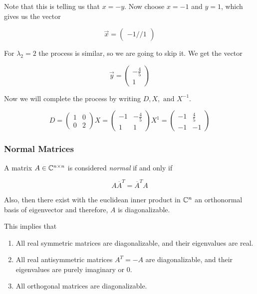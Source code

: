 Note that this is telling us that \(x = -y\). Now choose \(x = -1\) and \(y = 1\), which gives us 
the vector 

\[
    \vec{x} = \begin{pmatrix}
        -1 // 1
    \end{pmatrix}
\]

For \(\lambda_2 = 2\) the process is similar, so we are going to skip it. We get the vector

\[
    \vec{y} = \begin{pmatrix}
        -\frac{4}{5} \\ 1
    \end{pmatrix}
\]

Now we will complete the process by writing \(D, X, \text{ and } X^{-1}\).

\[
    D = \begin{pmatrix}
        1 & 0 \\
        0 & 2
    \end{pmatrix}
    X = \begin{pmatrix}
        -1  & -\frac{4}{5} \\
        1   &   1 
    \end{pmatrix}
    X^{1} = \begin{pmatrix}
        -1  & \frac{4}{5} \\
        -1   &   -1 
    \end{pmatrix}
\]

\subsubsection{Normal Matrices}

A matrix \(A \in \mathbb{C}^{n \times n}\) is considered \emph{normal} if and only if 

\[
    A \overline{A}^{T} = \overline{A}^T A
\]  

Also, then there exist with the euclidean inner product in \(\mathbb{C}^n\) an orthonormal basis 
of eigenvector and therefore, \(A\) is diagonalizable.

This implies that

\begin{enumerate}
    
    \item All real symmetric matrices are diagonalizable, and their eigenvalues are real.
    
    \item All real antisymmetric matrices \(A^T = -A\) are diagonalizable, and their eigenvalues are 
          purely imaginary or 0. 

    \item All orthogonal matrices are diagonalizable.

\end{enumerate}


